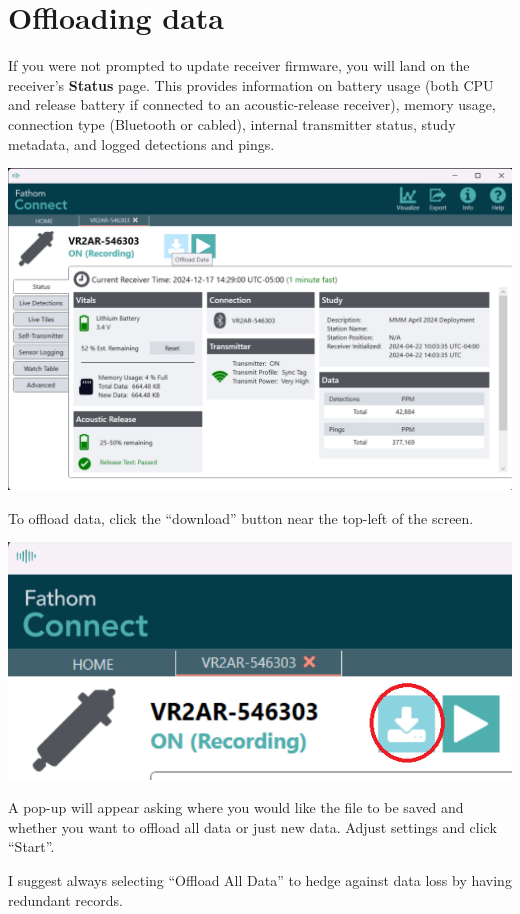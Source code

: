 \documentclass[
  letterpaper,
  DIV=11,
  numbers=noendperiod]{scrreprt}
\begin{document}
\section{Offloading data}\label{offloading-data}

If you were not prompted to update receiver firmware, you will land on
the receiver's \textbf{Status} page. This provides information on
battery usage (both CPU and release battery if connected to an
acoustic-release receiver), memory usage, connection type (Bluetooth or
cabled), internal transmitter status, study metadata, and logged
detections and pings.

\includegraphics{images/fathom/status_page.png}

To offload data, click the ``download'' button near the top-left of the
screen.

\includegraphics{images/fathom/buttons_download.png}

A pop-up will appear asking where you would like the file to be saved
and whether you want to offload all data or just new data. Adjust
settings and click ``Start''.

\begin{tcolorbox}[enhanced jigsaw, title=\textcolor{quarto-callout-tip-color}{\faLightbulb}\hspace{0.5em}{Tip}, leftrule=.75mm, colback=white, colframe=quarto-callout-tip-color-frame, opacityback=0, toptitle=1mm, titlerule=0mm, colbacktitle=quarto-callout-tip-color!10!white, toprule=.15mm, left=2mm, bottomtitle=1mm, arc=.35mm, breakable, coltitle=black, rightrule=.15mm, bottomrule=.15mm, opacitybacktitle=0.6]

I suggest always selecting ``Offload All Data'' to hedge against data
loss by having redundant records.

\end{tcolorbox}
\end{document}
